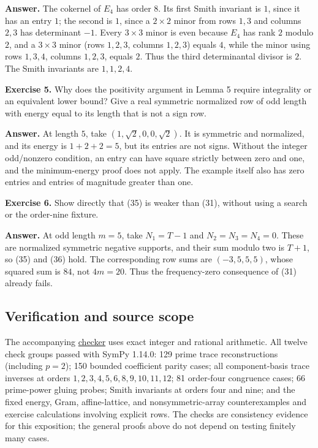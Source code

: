 \documentclass[
  11pt,
]{article}
\begin{document}
\textbf{Answer.} The cokernel of \(E_4\) has order \(8\). Its first
Smith invariant is \(1\), since it has an entry \(1\); the second is
\(1\), since a \(2\times2\) minor from rows \(1,3\) and columns \(2,3\)
has determinant \(-1\). Every \(3\times3\) minor is even because \(E_4\)
has rank \(2\) modulo \(2\), and a \(3\times3\) minor (rows \(1,2,3\),
columns \(1,2,3\)) equals \(4\), while the minor using rows \(1,3,4\),
columns \(1,2,3\), equals \(2\). Thus the third determinantal divisor is
\(2\). The Smith invariants are \(1,1,2,4\).

\textbf{Exercise 5.} Why does the positivity argument in Lemma 5 require
integrality or an equivalent lower bound? Give a real symmetric
normalized row of odd length with energy equal to its length that is not
a sign row.

\textbf{Answer.} At length \(5\), take \((1,\sqrt2,0,0,\sqrt2)\). It is
symmetric and normalized, and its energy is \(1+2+2=5\), but its entries
are not signs. Without the integer odd/nonzero condition, an entry can
have square strictly between zero and one, and the minimum-energy proof
does not apply. The example itself also has zero entries and entries of
magnitude greater than one.

\textbf{Exercise 6.} Show directly that (35) is weaker than (31),
without using a search or the order-nine fixture.

\textbf{Answer.} At odd length \(m=5\), take \(N_1=T-1\) and
\(N_2=N_3=N_4=0\). These are normalized symmetric negative supports, and
their sum modulo two is \(T+1\), so (35) and (36) hold. The
corresponding row sums are \((-3,5,5,5)\), whose squared sum is \(84\),
not \(4m=20\). Thus the frequency-zero consequence of (31) already
fails.

\subsection{Verification and source
scope}\label{verification-and-source-scope}

The accompanying \href{scripts/check_integral_crt.py}{checker} uses
exact integer and rational arithmetic. All twelve check groups passed
with SymPy 1.14.0: 129 prime trace reconstructions (including \(p=2\));
150 bounded coefficient parity cases; all component-basis trace inverses
at orders \(1,2,3,4,5,6,8,9,10,11,12\); 81 order-four congruence cases;
66 prime-power gluing probes; Smith invariants at orders four and nine;
and the fixed energy, Gram, affine-lattice, and nonsymmetric-array
counterexamples and exercise calculations involving explicit rows. The
checks are consistency evidence for this exposition; the general proofs
above do not depend on testing finitely many cases.
\end{document}
